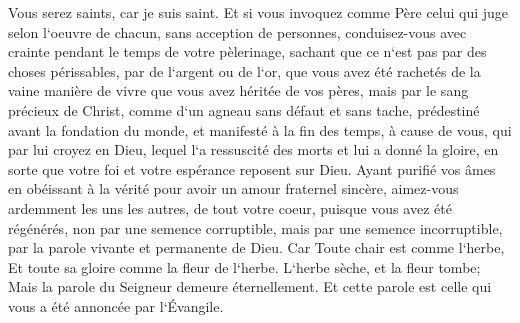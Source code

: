 \verse Vous serez saints, car je suis saint. 
\verse Et si vous invoquez comme Père celui qui juge selon l`oeuvre de chacun, sans acception de personnes, conduisez-vous avec crainte pendant le temps de votre pèlerinage, 
\verse sachant que ce n`est pas par des choses périssables, par de l`argent ou de l`or, que vous avez été rachetés de la vaine manière de vivre que vous avez héritée de vos pères, 
\verse mais par le sang précieux de Christ, comme d`un agneau sans défaut et sans tache, 
\verse prédestiné avant la fondation du monde, et manifesté à la fin des temps, à cause de vous, 
\verse qui par lui croyez en Dieu, lequel l`a ressuscité des morts et lui a donné la gloire, en sorte que votre foi et votre espérance reposent sur Dieu. 
\verse Ayant purifié vos âmes en obéissant à la vérité pour avoir un amour fraternel sincère, aimez-vous ardemment les uns les autres, de tout votre coeur, 
\verse puisque vous avez été régénérés, non par une semence corruptible, mais par une semence incorruptible, par la parole vivante et permanente de Dieu. 
\verse Car Toute chair est comme l`herbe, Et toute sa gloire comme la fleur de l`herbe. L`herbe sèche, et la fleur tombe; 
\verse Mais la parole du Seigneur demeure éternellement. Et cette parole est celle qui vous a été annoncée par l`Évangile. 

